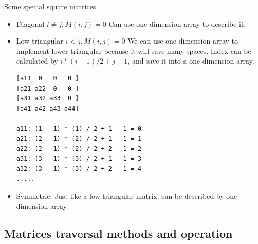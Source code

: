 \documentclass[a4paper,11pt,twoside]{book}
\begin{document}
\par  Some special square matrices
\begin{itemize}
	\item Diagonal  $i\neq j, M(i,j) = 0$ Can use one dimension array to describe it. 
	
	\item Low triangular $i<j, M(i,j) = 0$ We can use one dimension array to implement lower triangular because it will save many spaces.  Index can be calculated by $i*(i-1)/2+j-1$, and save it into a one dimension array. 

\begin{lstlisting}
[a11  0   0   0 ]
[a21 a22  0   0 ]
[a31 a32 a33  0 ]
[a41 a42 a43 a44]

a11: (1 - 1) * (1) / 2 + 1 - 1 = 0
a21: (2 - 1) * (2) / 2 + 1 - 1 = 1
a22: (2 - 1) * (2) / 2 + 2 - 1 = 2
a31: (3 - 1) * (3) / 2 + 1 - 1 = 3
a32: (3 - 1) * (3) / 2 + 2 - 1 = 4
.....
\end{lstlisting}
	
	\item Symmetric. Just like a low triangular matrix, can be described by one dimension array. 
\end{itemize}

\subsection{Matrices traversal methods and operation}
	
\end{document}
